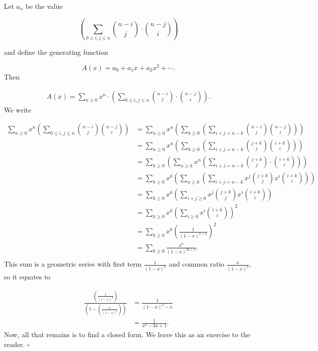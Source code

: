\documentclass{article}
\begin{document}
\begin{sol}

Let $a_n$ be the value

\[\left(\sum_{0 \le i, j \le n} \binom{n-i}{j} \cdot \binom{n-j}{i}\right)\]

and define the generating function 

\[A(x) = a_0 + a_1x + a_2x^2 + \cdots.\]
Then

\begin{align*}
A(x) = \sum_{n \ge 0} x^n \cdot \left(\sum_{0 \le i, j \le n} \binom{n-i}{j} \cdot \binom{n-j}{i}\right).
\end{align*}
We write

\begin{align*}
\sum_{n \ge 0} x^n\left(\sum_{0 \le i, j \le n} \binom{n-i}{j}\binom{n-j}{i}\right) & = \sum_{n \ge 0} x^n\left(\sum_{k \ge 0} \left(\sum_{i+j=n-k} \binom{n-i}{j}\binom{n-j}{i}\right)\right)\\
& = \sum_{n \ge 0} x^n\left(\sum_{k \ge 0} \left(\sum_{i+j=n-k} \binom{j+k}{j}\binom{i+k}{i}\right)\right)\\
& = \sum_{k \ge 0} \left(\sum_{n \ge k} x^n \left(\sum_{i+j=n-k} \binom{j+k}{j} \cdot \binom{i+k}{i}\right)\right)\\
& = \sum_{k \ge 0} x^k \left(\sum_{n \ge k} \left(\sum_{i+j=n-k} x^j\binom{j+k}{j} x^i\binom{i+k}{i}\right)\right)\\
& = \sum_{k \ge 0} x^k \left(\sum_{i+j \ge 0} x^j\binom{j+k}{j} x^i\binom{i+k}{i}\right)\\
& = \sum_{k \ge 0} x^k \left(\sum_{i \ge 0} x^i\binom{i+k}{i}\right)^2\\
& = \sum_{k \ge 0} x^k \left(\frac{1}{(1-x)^{k+1}}\right)^2\\
& = \sum_{k \ge 0} \frac{x^k}{(1-x)^{2k+2}}.\\
\end{align*}
This sum is a geometric series with first term $\frac{1}{(1-x)^2}$ and common ratio $\frac{x}{(1-x)^2}$, so it equates to

\begin{align*}
\frac{\left(\frac{1}{(1-x)^2}\right)}{\left(1-\left(\frac{x}{(1-x)^2}\right)\right)} & = \frac{1}{(1-x)^2 - x}\\
& = \frac{1}{x^2 - 3x + 1}.
\end{align*}
Now, all that remains is to find a closed form. We leave this as an exercise to the reader. $\square$
\end{sol}

\newpage
\end{document}

